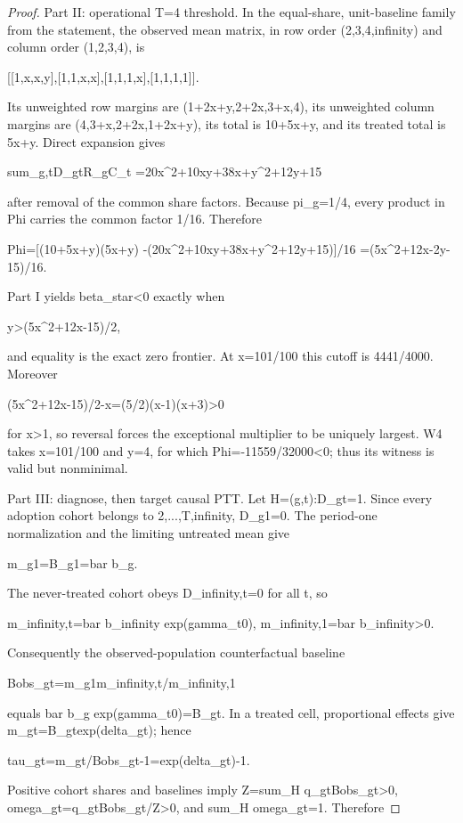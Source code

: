 \documentclass{article}
\begin{document}
\begin{proof}
Part II: operational T=4 threshold. In the equal-share, unit-baseline family from the statement, the observed mean matrix, in row order (2,3,4,infinity) and column order (1,2,3,4), is

  [[1,x,x,y],[1,1,x,x],[1,1,1,x],[1,1,1,1]].

Its unweighted row margins are (1+2x+y,2+2x,3+x,4), its unweighted column margins are (4,3+x,2+2x,1+2x+y), its total is 10+5x+y, and its treated total is 5x+y. Direct expansion gives

  sum_{g,t}D_{gt}R_gC_t
   =20x^2+10xy+38x+y^2+12y+15

after removal of the common share factors. Because pi_g=1/4, every product in Phi carries the common factor 1/16. Therefore

  Phi=[(10+5x+y)(5x+y)
       -(20x^2+10xy+38x+y^2+12y+15)]/16
      =(5x^2+12x-2y-15)/16.

Part I yields beta_star<0 exactly when

  y>(5x^2+12x-15)/2,

and equality is the exact zero frontier. At x=101/100 this cutoff is 4441/4000. Moreover

  (5x^2+12x-15)/2-x=(5/2)(x-1)(x+3)>0

for x>1, so reversal forces the exceptional multiplier to be uniquely largest. W4 takes x=101/100 and y=4, for which Phi=-11559/32000<0; thus its witness is valid but nonminimal.

Part III: diagnose, then target causal PTT. Let H={(g,t):D_{gt}=1}. Since every adoption cohort belongs to {2,...,T,infinity}, D_{g1}=0. The period-one normalization and the limiting untreated mean give

  m_{g1}=B_{g1}=bar b_g.

The never-treated cohort obeys D_{infinity,t}=0 for all t, so

  m_{infinity,t}=bar b_infinity exp(gamma_{t0}),
  m_{infinity,1}=bar b_infinity>0.

Consequently the observed-population counterfactual baseline

  Bobs_{gt}=m_{g1}m_{infinity,t}/m_{infinity,1}

equals bar b_g exp(gamma_{t0})=B_{gt}. In a treated cell, proportional effects give m_{gt}=B_{gt}exp(delta_{gt}); hence

  tau_{gt}=m_{gt}/Bobs_{gt}-1=exp(delta_{gt})-1.

Positive cohort shares and baselines imply Z=sum_H q_{gt}Bobs_{gt}>0, omega_{gt}=q_{gt}Bobs_{gt}/Z>0, and sum_H omega_{gt}=1. Therefore


\end{proof}
\end{document}

